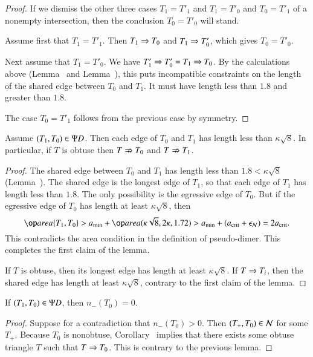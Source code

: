 \begin{proof}  
  If we dismiss the other three cases $T_1=T'_1$ and $T_1=T'_0$ and
  $T_0=T'_1$ of a nonempty intersection, then the conclusion $T_0 =
  T'_0$ will stand.

  Assume first that $T_1 = T'_1$.  Then $T_1\Rightarrow T_0$ and $T_1\Rightarrow
  T'_0$, which gives $T_0=T'_0$.

  Next assume that $T_1=T'_0$.  We have $T'_1\Rightarrow T'_0 = T_1 \Rightarrow T_0$.
  By the calculations above (Lemma~ and
  Lemma~), this puts incompatible constraints on the
  length of the shared edge between $T_0$ and $T_1$.  It must have
  length less than $1.8$ and greater than $1.8$.

  The case $T_0=T'_1$ follows from the previous case by symmetry.
\end{proof}

\begin{lemma}
  Assume $(T_1,T_0)\in\Psi D$.  Then each edge of $T_0$ and $T_1$ has
  length less than $\kappa\sqrt8$.  In particular, if $T$ is obtuse
  then $T\nRightarrow T_0$ and $T \nRightarrow T_1$.
\end{lemma}

\begin{proof} 
  The shared edge between $T_0$ and $T_1$ has length less than $1.8 <
  \kappa\sqrt8$ (Lemma~).  The shared edge is the
  longest edge of $T_1$, so that each edge of $T_1$ has length less
  than $1.8$.  The only possibility is the egressive edge of $T_0$.
  But if the egressive edge of $T_0$ has length at least
  $\kappa\sqrt8$, then
\[
\area\{T_1,T_0\} > \ao + \area(\kappa\sqrt8,2\kappa,1.72) 
> \ao + (\acrit + \epsN) = 2\acrit.
\]
This contradicts the area condition in the definition of pseudo-dimer.
This completes the first claim of the lemma.

If $T$ is obtuse, then its longest edge has length at least
$\kappa\sqrt8$.  If $T\Rightarrow T_i$, then the shared edge has length at
least $\kappa\sqrt8$, contrary to the first claim of the lemma.
\end{proof}

\begin{corollary}
If $(T_1,T_0)\in\Psi D$, then $n_-(T_0)=0$.
\end{corollary}

\begin{proof} 
  Suppose for a contradiction that $n_-(T_0)>0$.  Then $(T_+,T_0)\in
  \mathcal N$ for some $T_+$.  Because $T_0$ is nonobtuse,
  Corollary~ implies that there exists some
  obtuse triangle $T$ such that $T\Rightarrow T_0$.  This is contrary to the
  previous lemma.
\end{proof}

